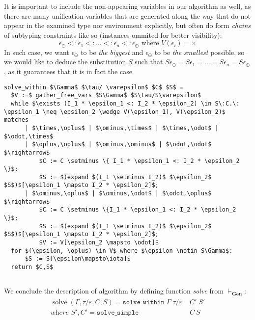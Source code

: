 \documentclass[declaration,shortabstract]{iithesis}
\theoremstyle{definition} \newtheorem{definition}{Definition}[section]
\begin{document}
It is important to include the non-appearing variables in our algorithm as well,
as there are many unification variables that are generated along the way
that do not appear in the examined type nor environment explicitly,
but often do form \textit{chains} of subtyping constraints like so
(instances ommited for better visibility):
$$\epsilon_\ominus <: \epsilon_1 <: \dots <: \epsilon_n <: \epsilon_\oplus \text{ where } V(\epsilon_i) = \times$$
In such case, we want $\epsilon_\ominus$ to be \textit{the biggest} and $\epsilon_\oplus$ to be \textit{the smallest} possible, so we would like to deduce the substitution $S$ such that
$S\epsilon_\ominus = S\epsilon_1 = \dots = S\epsilon_n = S\epsilon_\oplus$,
as it guarantees that it is in fact the case.

\begin{lstlisting}
solve_within $\Gamma$ $\tau/ \varepsilon$ $C$ $S$ =
  $V :=$ gather_free_vars $S\Gamma$ $S\tau/S\varepsilon$
  while $\exists (I_1 * \epsilon_1 <: I_2 * \epsilon_2) \in S\:C.\: \epsilon_1 \neq \epsilon_2 \wedge V(\epsilon_1), V(\epsilon_2)$ matches
      | $\times,\oplus$ | $\ominus,\times$ | $\times,\odot$ | $\odot,\times$
      | $\oplus,\oplus$ | $\ominus,\ominus$ | $\odot,\odot$ $\rightarrow$
          $C := C \setminus \{ I_1 * \epsilon_1 <: I_2 * \epsilon_2 \}$;
          $S := $(expand $(I_1 \setminus I_2)$ $\epsilon_2$ $S$)$[\epsilon_1 \mapsto I_2 * \epsilon_2]$;
      | $\ominus,\oplus$ | $\ominus,\odot$ | $\odot,\oplus$ $\rightarrow$
          $C := C \setminus \{I_1 * \epsilon_1 <: I_2 * \epsilon_2 \}$;
          $S := $(expand $(I_1 \setminus I_2)$ $\epsilon_2$ $S$)$[\epsilon_1 \mapsto I_2 * \epsilon_2]$;
          $V := V[\epsilon_2 \mapsto \odot]$
  for $(\epsilon, \oplus) \in V$ where $\epsilon \notin S\Gamma$:
      $S := S[\epsilon\mapsto\iota]$
  return $C,S$
  
\end{lstlisting}
We conclude the description of algorithm by
defining function \textit{solve} from $\vdash_\textbf{Gen}$:
\begin{gather*}\begin{aligned}
\operatorname{solve}(\Gamma, \tau/\varepsilon, C, S) = 
    \texttt{solve\_within}\;\Gamma\;\tau / \varepsilon\;& C'\;S' \\
    \textit{where } S', C' = \texttt{solve\_simple}\;& C\:S 
\end{aligned}
\end{gather*}

\end{document}
